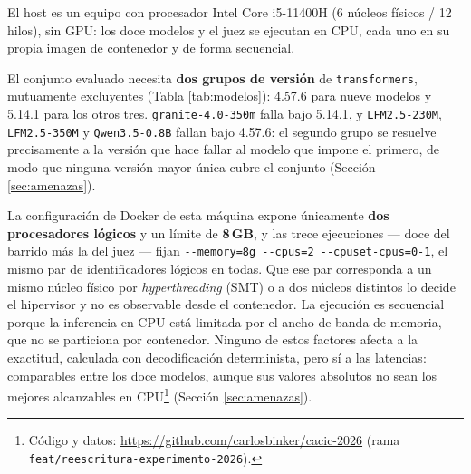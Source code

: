 El host es un equipo con procesador Intel Core i5-11400H (6 núcleos físicos / 12 hilos), sin GPU:
los doce modelos y el juez se ejecutan en CPU, cada uno en su propia imagen
de contenedor y de forma secuencial.

El conjunto evaluado necesita \textbf{dos grupos de versión} de
\texttt{transformers}, mutuamente excluyentes (Tabla \ref{tab:modelos}):
4.57.6 para nueve modelos y 5.14.1 para los otros tres.
\texttt{granite-4.0-350m} falla bajo 5.14.1, y \texttt{LFM2.5-230M},
\texttt{LFM2.5-350M} y \texttt{Qwen3.5-0.8B} fallan bajo 4.57.6: el segundo
grupo se resuelve precisamente a la versión que hace fallar al modelo que
impone el primero, de modo que ninguna versión mayor única cubre el conjunto
(Sección \ref{sec:amenazas}).

La configuración de Docker de esta máquina expone únicamente \textbf{dos
procesadores lógicos} y un límite de \textbf{8\,GB}, y las trece ejecuciones
— doce del barrido más la del juez — fijan \texttt{-{}-memory=8g -{}-cpus=2
-{}-cpuset-cpus=0-1}, el mismo par de identificadores lógicos en todas. Que
ese par corresponda a un mismo núcleo físico por \emph{hyperthreading} (SMT)
o a dos núcleos distintos lo decide el hipervisor y no es observable desde el
contenedor. La ejecución es secuencial porque la inferencia en CPU está
limitada por el ancho de banda de memoria, que no se particiona por
contenedor. Ninguno de estos factores afecta a la exactitud, calculada con decodificación
determinista, pero sí a las latencias: comparables entre los doce modelos,
aunque sus valores absolutos no sean los mejores alcanzables en
CPU\footnote{Código y datos: \url{https://github.com/carlosbinker/cacic-2026}
(rama \texttt{feat/reescritura-experimento-2026}).} (Sección \ref{sec:amenazas}).
